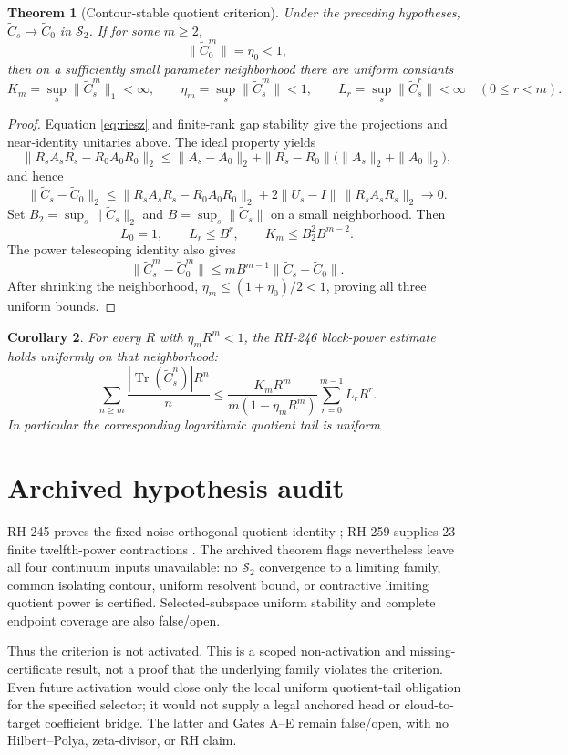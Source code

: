 \documentclass[11pt]{article}
\newtheorem{theorem}{Theorem}[section]\newtheorem{corollary}[theorem]{Corollary}\theoremstyle{remark}\newtheorem{remark}[theorem]{Remark}
\begin{document}
\begin{theorem}[Contour-stable quotient criterion]
Under the preceding hypotheses, $\widetilde C_s\to\widetilde C_0$ in
$\mathcal S_2$.  If for some
$m\ge2$,
\[
 \|\widetilde C_0^m\|=\eta_0<1,
\]
then on a sufficiently small parameter neighborhood there are uniform
constants
\[
 K_m=\sup_s\|\widetilde C_s^m\|_1<\infty,\qquad
 \eta_m=\sup_s\|\widetilde C_s^m\|<1,\qquad
 L_r=\sup_s\|\widetilde C_s^r\|<\infty\quad(0\le r<m).
\]
\end{theorem}
\begin{proof}
Equation \eqref{eq:riesz} and finite-rank gap stability give the projections
and near-identity unitaries above.  The ideal property yields
\[
 \|R_sA_sR_s-R_0A_0R_0\|_2
 \le \|A_s-A_0\|_2+
 \|R_s-R_0\|\bigl(\|A_s\|_2+\|A_0\|_2\bigr),
\]
and hence
\[
 \|\widetilde C_s-\widetilde C_0\|_2
 \le \|R_sA_sR_s-R_0A_0R_0\|_2
 +2\|U_s-I\|\,\|R_sA_sR_s\|_2\longrightarrow0.
\]
Set $B_2=\sup_s\|\widetilde C_s\|_2$ and
$B=\sup_s\|\widetilde C_s\|$ on a small neighborhood.  Then
\[
 L_0=1,\qquad L_r\le B^r,\qquad
 K_m\le B_2^2B^{m-2}.
\]
The power telescoping identity also gives
\[
 \|\widetilde C_s^m-\widetilde C_0^m\|
 \le mB^{m-1}\|\widetilde C_s-\widetilde C_0\|.
\]
After shrinking the neighborhood,
$\eta_m\le(1+\eta_0)/2<1$, proving all three uniform bounds.
\end{proof}

\begin{corollary}
For every $R$ with $\eta_mR^m<1$, the RH-246 block-power estimate holds
uniformly on that neighborhood:
\[
 \sum_{n\ge m}\frac{|\operatorname{Tr}(\widetilde C_s^n)|R^n}{n}
 \le \frac{K_mR^m}{m(1-\eta_mR^m)}
       \sum_{r=0}^{m-1}L_rR^r.
\]
In particular the corresponding logarithmic quotient tail is uniform
\citep{WangRH246}.
\end{corollary}

\section{Archived hypothesis audit}
RH-245 proves the fixed-noise orthogonal quotient identity
\citep{WangRH245}; RH-259 supplies 23 finite twelfth-power contractions
\citep{WangRH259}.  The archived theorem flags nevertheless leave all four
continuum inputs unavailable: no $\mathcal S_2$ convergence to a limiting
family, common isolating contour, uniform resolvent bound, or contractive
limiting quotient power is certified.  Selected-subspace uniform stability
and complete endpoint coverage are also false/open.

Thus the criterion is not activated.  This is a scoped non-activation and
missing-certificate result, not a proof that the underlying family violates
the criterion.  Even future activation would close only the local uniform
quotient-tail obligation for the specified selector; it would not supply a
legal anchored head or cloud-to-target coefficient bridge.  The latter and
Gates A--E remain false/open, with no Hilbert--Polya, zeta-divisor, or RH
claim.


\end{document}
